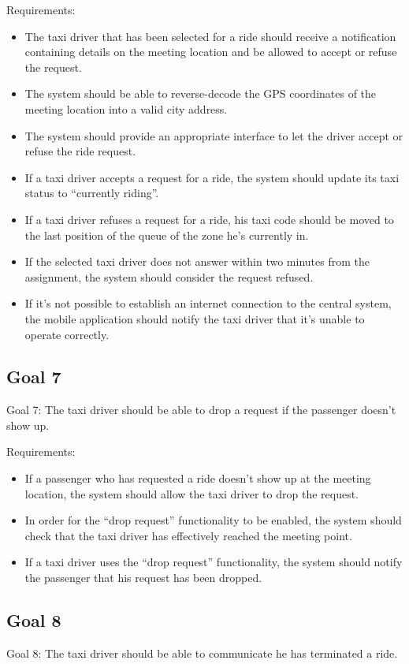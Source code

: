 Requirements:
\begin{itemize}
\item The taxi driver that has been selected for a ride should receive a notification containing details on the meeting location and be allowed to accept or refuse the request.
\item The system should be able to reverse-decode the GPS coordinates of the meeting location into a valid city address.
\item The system should provide an appropriate interface to let the driver accept or refuse the ride request.
\item If a taxi driver accepts a request for a ride, the system should update its taxi status to “currently riding”.
\item If a taxi driver refuses a request for a ride, his taxi code should be moved to the last position of the queue of the zone he’s currently in.
\item If the selected taxi driver does not answer within two minutes from the assignment, the system should consider the request refused. 
\item If it’s not possible to establish an internet connection to the central system, the mobile application should notify the taxi driver that it’s unable to operate correctly.
\end{itemize}

\subsection{Goal 7}
Goal 7: The taxi driver should be able to drop a request if the passenger doesn’t show up.

Requirements:
\begin{itemize}
\item If a passenger who has requested a ride doesn’t show up at the meeting location, the system should allow the taxi driver to drop the request. 
\item In order for the “drop request” functionality to be enabled, the system should check that the taxi driver has effectively reached the meeting point.
\item If a taxi driver uses the “drop request” functionality, the system should notify the passenger that his request has been dropped.
\end{itemize}

\subsection{Goal 8}
Goal 8: The taxi driver should be able to communicate he has terminated a ride.

